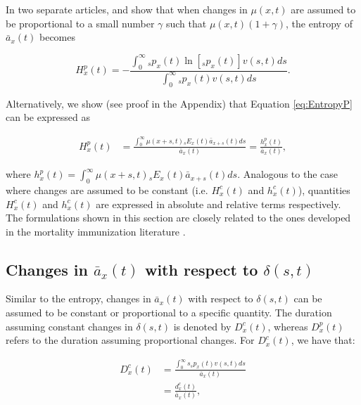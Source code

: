 \documentclass[12pt]{article}
\begin{document}
In two separate articles, \citet{Haberman2011} and \citet{Tsai2013a} show that when changes in $\mu(x,t)$ are assumed to be proportional to a small number $\gamma$ such that $\mu(x,t)(1+\gamma)$, the entropy of $\bar{a}_x(t)$ becomes

\begin{equation} \label{eq:EntropyP}
{H}^{p}_{x}(t) = -\frac{ \int_{0}^{\infty}{}_sp_x(t)\ln[{}_sp_x(t)] {v}(s,t) ds}{\int_0^\infty {}_sp_x(t) {v}(s,t) ds}.
\end{equation}


Alternatively, we show (see proof in the Appendix) that Equation \ref{eq:EntropyP} can be expressed as

\begin{equation} \label{eq:EntropyP2}
\begin{split}
{H}^{p}_{x}(t) &=  \frac{\int_0^\infty \mu(x+s,t)   {}_sE_x(t) \bar{a}_{x+s}(t) ds}{\bar{a}_x(t)} =  \frac{{h}^{p}_{x}(t)}{\bar{a}_x(t)}, 
\end{split}
\end{equation}

where ${h}^{p}_{x}(t)=\int_0^\infty \mu(x+s,t)   {}_sE_x(t) \bar{a}_{x+s}(t) ds$. Analogous to the case where changes are assumed to be constant (i.e. ${H}^{c}_{x}(t)$ and ${h}^{c}_{x}(t)$), quantities ${H}^{c}_{x}(t)$ and ${h}^{c}_{x}(t)$ are expressed in absolute and relative terms respectively. The formulations shown in this section are closely related to the ones developed in the mortality immunization literature \citep{Tsai2013a,Lin2020}.

 
 

\subsection{Changes in $\bar{a}_x(t)$ with respect to $\delta(s,t)$}

 Similar to the entropy, changes in $\bar{a}_x(t)$ with respect to $\delta(s,t)$ can be assumed to be constant or proportional to a specific quantity. The duration assuming constant changes in $\delta(s,t)$ is denoted by ${D}^{c}_{x}(t)$, whereas ${D}^{p}_{x}(t)$ refers to the duration assuming proportional changes. For ${D}^{c}_{x}(t)$, we have that:



\begin{equation}\label{eq:DurationC}
\begin{split}
{D}^{c}_x(t)&= \frac{\int_0^\infty s {}_sp_x(t) {v}(s,t)ds}{\bar{a}_x(t)} \\
&= \frac{{d}^{c}_x(t)}{\bar{a}_x(t)},
\end{split}
\end{equation}
\end{document}
